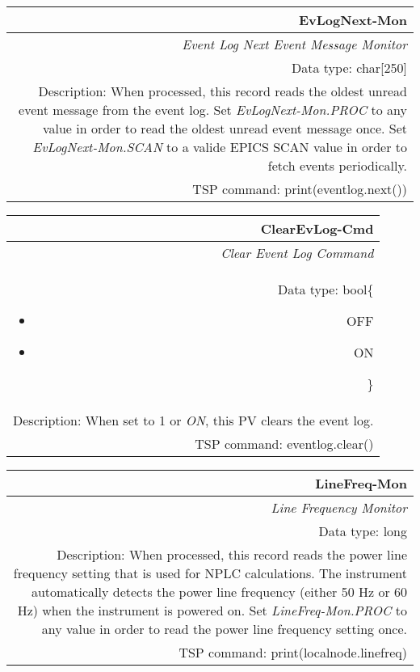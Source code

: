 \documentclass[openany]{article}
\begin{document}
		\begin{tabular}{N}
			\hline
			\bfseries EvLogNext-Mon\label{pv:evlognext-mon} \\ \hline
			\emph{Event Log Next Event Message Monitor} \\
			Data type: char[250] \\
			Description: When processed, this record reads the oldest unread event message from the event log. Set \emph{EvLogNext-Mon.PROC} to any value in order to read the oldest unread event message once. Set \emph{EvLogNext-Mon.SCAN} to a valide EPICS SCAN value in order to fetch events periodically. \\
			TSP command: print(eventlog.next())
		\end{tabular}

		\begin{tabular}{N}
			\hline
			\bfseries ClearEvLog-Cmd\label{pv:clearevlog-cmd} \\ \hline
			\emph{Clear Event Log Command} \\
			Data type: bool\{\begin{itemize}[noitemsep]
				\small
				\item[] OFF
				\item[] ON
			\end{itemize}\} \\
			Description: When set to 1 or \emph{ON}, this PV clears the event log. \\
			TSP command: eventlog.clear()
		\end{tabular}

		\begin{tabular}{N}
			\hline
			\bfseries LineFreq-Mon\label{pv:linefreq-mon} \\ \hline
			\emph{Line Frequency Monitor} \\
			Data type: long \\
			Description: When processed, this record reads the power line frequency setting that is used for NPLC calculations. The instrument automatically detects the power line frequency (either 50 Hz or 60 Hz) when the instrument is powered on. Set \emph{LineFreq-Mon.PROC} to any value in order to read the power line frequency setting once. \\
			TSP command: print(localnode.linefreq)
		\end{tabular}
\end{document}
